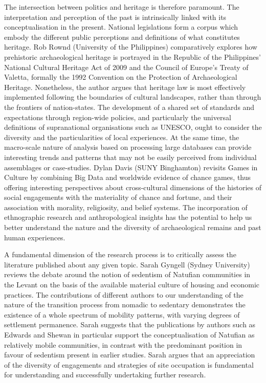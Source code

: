 The intersection between politics and heritage is therefore paramount. The interpretation and perception of the past is intrinsically linked with its conceptualisation in the present. National legislations form a corpus which embody the different public perceptions and definitions of what constitutes heritage. Rob Rownd (University of the Philippines) comparatively explores how prehistoric archaeological heritage is portrayed in the Republic of the Philippines’ National Cultural Heritage Act of 2009 and the Council of Europe’s Treaty of Valetta, formally the 1992 Convention on the Protection of Archaeological Heritage. Nonetheless, the author argues that heritage law is most effectively implemented following the boundaries of cultural landscapes, rather than through the frontiers of nation-states. The development of a shared set of standards and expectations through region-wide policies, and particularly the universal definitions of supranational organisations such as UNESCO, ought to consider the diversity and the particularities of local experiences.
At the same time, the macro-scale nature of analysis based on processing large databases can provide interesting trends and patterns that may not be easily perceived from individual assemblages or case-studies. Dylan Davis (SUNY Binghamton) revisits Games in Culture by combining Big Data and worldwide evidence of chance games, thus offering interesting perspectives about cross-cultural dimensions of the histories of social engagements with the materiality of chance and fortune, and their association with morality, religiosity, and belief systems. The incorporation of ethnographic research and anthropological insights has the potential to help us better understand the nature and the diversity of archaeological remains and past human experiences.

\IJSRAseparator

A fundamental dimension of the research process is to critically assess the literature published about any given topic. Sarah Gyngell (Sydney University) reviews the debate around the notion of sedentism of Natufian communities in the Levant on the basis of the available material culture of housing and economic practices. The contributions of different authors to our understanding of the nature of the transition process from nomadic to sedentary demonstrates the existence of a whole spectrum of mobility patterns, with varying degrees of settlement permanence. Sarah suggests that the publications by authors such as Edwards and Shewan in particular support the conceptualisation of Natufian as relatively mobile communities, in contrast with the predominant position in favour of sedentism present in earlier studies. Sarah argues that an appreciation of the diversity of engagements and strategies of site occupation is fundamental for understanding and successfully undertaking further research.



